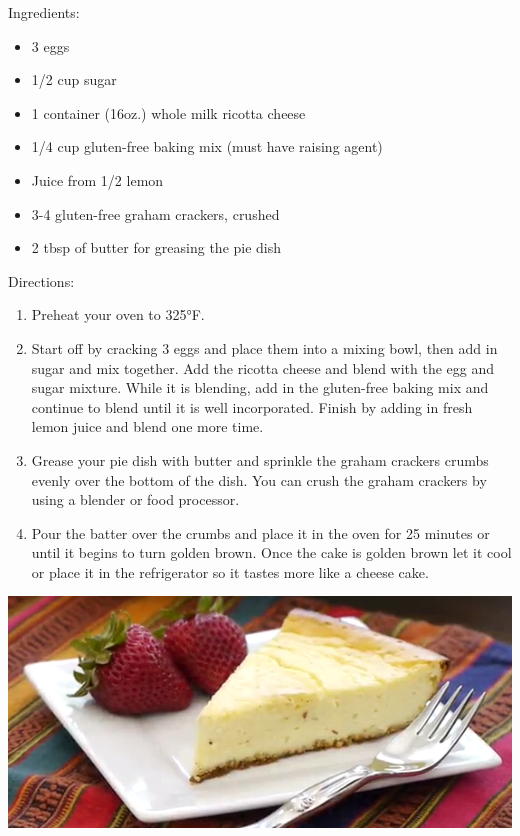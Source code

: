 \documentclass{article}
\begin{document}
%
%
%
%
%

\begin{multicols}{2}
Ingredients:
\begin{itemize}
\item 3 eggs
\item 1/2 cup sugar
\item 1 container (16oz.) whole milk ricotta cheese
\item 1/4 cup gluten-free baking mix (must have raising agent)
\item Juice from 1/2 lemon
\item 3-4 gluten-free graham crackers, crushed
\item 2 tbsp of butter for greasing the pie dish
\end{itemize}

\columnbreak

Directions:
\begin{enumerate}
\item Preheat your oven to 325°F.

\item Start off by cracking 3 eggs and place them into a mixing bowl, then add in sugar and mix together. Add the ricotta cheese and blend with the egg and sugar mixture. While it is blending, add in the gluten-free baking mix and continue to blend until it is well incorporated. Finish by adding in fresh lemon juice and blend one more time.

\item Grease your pie dish with butter and sprinkle the graham crackers crumbs evenly over the bottom of the dish. You can crush the graham crackers by using a blender or food processor.

\item Pour the batter over the crumbs and place it in the oven for 25 minutes or until it begins to turn golden brown. Once the cake is golden brown let it cool or place it in the refrigerator so it tastes more like a cheese cake.
\end{enumerate}
\end{multicols}



\begin{center}
\includegraphics[scale=0.4]{RicottaCake.png}
\end{center}
\end{document}
